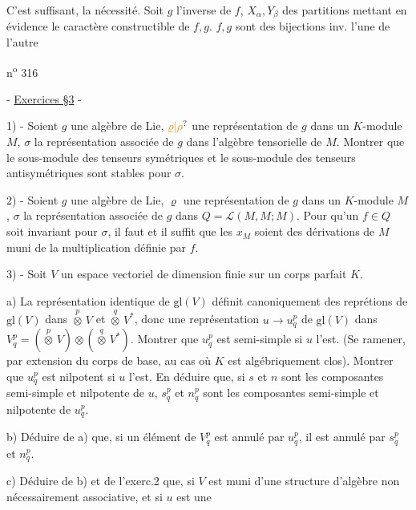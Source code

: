C'est  suffisant,  la nécessité. Soit $g$ l'inverse de $f$, $X_\alpha,Y_\beta$ des partitions  mettant en évidence le caractère constructible de $f,g$.  $f,g$ sont des bijections inv. l'une de l'autre



\hfill n\textsuperscript{o} 316

- \uline{Exercices  §3} -

1) - Soient $g$ une algèbre de Lie, $\unsure{\varrho|\rho}$ une représentation de $g$ dans un $K$-module $M$, $\sigma$ la représentation associée de $g$ dans l'algèbre tensorielle de $M$. Montrer que le sous-module des tenseurs symétriques et le sous-module des tenseurs antisymétriques sont stables pour $\sigma$.

2) - Soient $g$ une algèbre de Lie, $\varrho$ une représentation de $g$ dans un $K$-module $M$, $\sigma$ la représentation associée de $g$ dans $Q=\mathcal{L}(M,M;M)$. Pour qu'un $f\in Q$ soit invariant pour $\sigma$, il faut et il suffit que les $x_M$ soient des dérivations de $M$ muni de la multiplication définie par $f$.

3) - Soit $V$ un espace vectoriel de dimension finie sur un corps parfait $K$.

a) La représentation identique de $\mathrm{gl}(V)$ définit canoniquement des reprétions de $\mathrm{gl}(V)$ dans $\overset{p}{\otimes}\,V$ et $\overset{q}{\otimes}\,V^*$, donc une représentation $u\longrightarrow u^p_q$ de $\mathrm{gl}(V)$ dans $V^p_q=(\overset{p}{\otimes}\,V)\otimes(\overset{q}{\otimes}\,V^*)$. Montrer que $u^p_q$ est semi-simple si $u$ l'est. (Se ramener, par extension du corps de base, au cas où $K$ est algébriquement clos). Montrer que $u^p_q$ est nilpotent si $u$ l'est. En déduire que, si $s$ et $n$ sont les composantes semi-simple et nilpotente de $u$, $s^p_q$ et $n^p_q$ sont les composantes semi-simple et nilpotente de $u^p_q$.

b) Déduire de a) que, si un élément de $V^p_q$ est annulé par $u^p_q$, il est annulé par $s^p_q$ et $n^p_q$.

c) Déduire de b) et de l'exerc.2 que, si $V$ est muni d'une structure d'algèbre non nécessairement associative, et si $u$ est une

